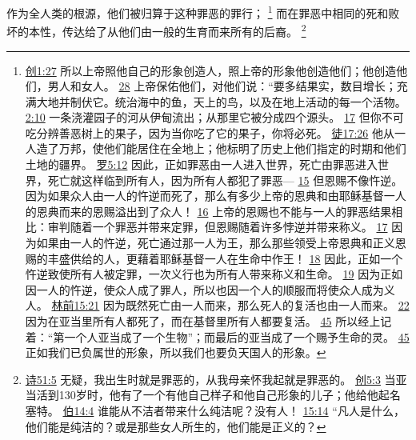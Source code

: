 \documentclass[12pt, a4paper, oneside]{ctexart}
\newcounter{parnum}[section]
\newcommand{\N}{%
   \noindent\refstepcounter{parnum}%
    \makebox[\parindent][l]{\textbf{\arabic{parnum}.}}}
\begin{document}
\N 作为全人类的根源，他们被归算于这种罪恶的罪行；
	\footnote {
		\href{https://biblehub.com/genesis/1-27.htm}{创1:27} 所以上帝照他自己的形象创造人，照上帝的形象他创造他们；他创造他们，男人和女人。
		\href{https://biblehub.com/genesis/1-28.htm}{28} 上帝保佑他们，对他们说：“要多结果实，数目增长；充满大地并制伏它。统治海中的鱼，天上的鸟，以及在地上活动的每一个活物。 
		\href{https://biblehub.com/genesis/2-10.htm}{2:10} 一条浇灌园子的河从伊甸流出；从那里它被分成四个源头。
		\href{https://biblehub.com/genesis/2-17.htm}{17} 但你不可吃分辨善恶树上的果子，因为当你吃了它的果子，你将必死。
		\href{https://biblehub.com/acts/17-26.htm}{徒17:26} 他从一人造了万邦，使他们能居住在全地上；他标明了历史上他们指定的时期和他们土地的疆界。
		\href{https://biblehub.com/romans/5-12.htm}{罗5:12} 因此，正如罪恶由一人进入世界，死亡由罪恶进入世界，死亡就这样临到所有人，因为所有人都犯了罪恶---
		\href{https://biblehub.com/romans/5-15.htm}{15} 但恩赐不像忤逆。因为如果众人由一人的忤逆而死了，那么有多少上帝的恩典和由耶稣基督一人的恩典而来的恩赐溢出到了众人！
		\href{https://biblehub.com/romans/5-16.htm}{16} 上帝的恩赐也不能与一人的罪恶结果相比：审判随着一个罪恶并带来定罪，但恩赐随着许多悖逆并带来称义。
		\href{https://biblehub.com/romans/5-17.htm}{17} 因为如果由一人的忤逆，死亡通过那一人为王，那么那些领受上帝恩典和正义恩赐的丰盛供给的人，更藉着耶稣基督一人在生命中作王！
		\href{https://biblehub.com/romans/5-18.htm}{18} 因此，正如一个忤逆致使所有人被定罪，一次义行也为所有人带来称义和生命。
		\href{https://biblehub.com/romans/5-19.htm}{19} 因为正如因一人的忤逆，使众人成了罪人，所以也因一个人的顺服而将使众人成为义人。
		\href{https://biblehub.com/1_corinthians/15-21.htm}{林前15:21} 因为既然死亡由一人而来，那么死人的复活也由一人而来。
		\href{https://biblehub.com/1_corinthians/15-22.htm}{22} 因为在亚当里所有人都死了，而在基督里所有人都要复活。
		\href{https://biblehub.com/1_corinthians/15-45.htm}{45} 所以经上记着：“第一个人亚当成了一个生物”；而最后的亚当成了一个赐予生命的灵。
		\href{https://biblehub.com/1_corinthians/15-49.htm}{45} 正如我们已负属世的形象，所以我们也要负天国人的形象。
	}
	而在罪恶中相同的死和败坏的本性，传达给了从他们由一般的生育而来所有的后裔。
	\footnote {
		\href{https://biblehub.com/psalms/51-5.htm}{诗51:5} 无疑，我出生时就是罪恶的，从我母亲怀我起就是罪恶的。
		\href{https://biblehub.com/genesis/5-3.htm}{创5:3} 当亚当活到130岁时，他有了一个有他自己样子和他自己形象的儿子；他给他起名塞特。
		\href{https://biblehub.com/job/14-4.htm}{伯14:4} 谁能从不洁者带来什么纯洁呢？没有人！
		\href{https://biblehub.com/job/15-14.htm}{15:14} “凡人是什么，他们能是纯洁的？或是那些女人所生的，他们能是正义的？
	}
\end{document}
